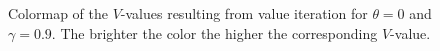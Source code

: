 \documentclass{article}
\begin{document}
\begin{figure}[htb]
        \caption{\label{colormapValueIteration} Colormap of the $V$-values  resulting from value iteration for $\theta=0$ and $\gamma = 0.9$. The brighter the color the higher the corresponding $V$-value.}
      \end{figure}
\end{document}
